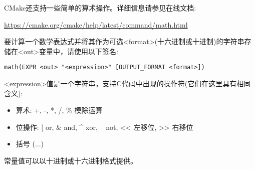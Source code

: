 CMake还支持一些简单的算术操作。详细信息请参见在线文档:

\url{https://cmake.org/cmake/help/latest/command/math.html}

要计算一个数学表达式并将其作为可选<format>(十六进制或十进制)的字符串存储在<out>变量中，请使用以下签名:

\begin{lstlisting}[style=styleCMake]
math(EXPR <out> "<expression>" [OUTPUT_FORMAT <format>])
\end{lstlisting}

<expression>值是一个字符串，支持C代码中出现的操作符(它们在这里具有相同含义):

\begin{itemize}
\item 
算术: +, -, *, /, \% 模除运算

\item 
位操作: | or, \& and, \^{} xor, ~ not, <{}< 左移位, >{}> 右移位

\item 
括号 (...)
\end{itemize}

常量值可以以十进制或十六进制格式提供。













